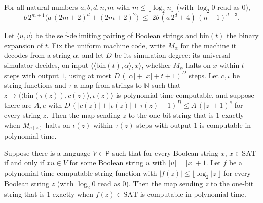 \begin{theorem}
\label{Complexity.ladner_short_SAT_envelope}
\leanok
{}
For all natural numbers $a,b,d,n,m$ with $m\le\lfloor\log_2 n\rfloor$ (with $\log_2 0$ read as $0$),
\[
  b\,2^{m+1}\bigl(a\,(2m+2)^d+(2m+2)^2\bigr)\;\le\;2b\,(a\,2^d+4)\,(n+1)^{d+3}.
\]
\end{theorem}

\begin{theorem}
\label{Complexity.ladner_simulation_on_image}
\leanok
{}
Let $\langle u,v\rangle$ be the self-delimiting pairing of Boolean strings and $\mathrm{bin}(t)$
the binary expansion of $t$. Fix the uniform machine code, write $M_\alpha$ for the machine it
decodes from a string $\alpha$, and let $D$ be its simulation degree: its universal simulator
decides, on input $\langle\langle\mathrm{bin}(t),\alpha\rangle,x\rangle$, whether $M_\alpha$ halts
on $x$ within $t$ steps with output $1$, using at most $D\,(|\alpha|+|x|+t+1)^D$ steps. Let
$c,\iota$ be string functions and $\tau$ a map from strings to $\mathbb N$ such that
$z\mapsto\langle\langle\mathrm{bin}(\tau(z)),c(z)\rangle,\iota(z)\rangle$ is polynomial-time
computable, and suppose there are $A,e$ with
$D\,(|c(z)|+|\iota(z)|+\tau(z)+1)^D\le A\,(|z|+1)^e$ for every string $z$. Then the map sending
$z$ to the one-bit string that is $1$ exactly when $M_{c(z)}$ halts on $\iota(z)$ within
$\tau(z)$ steps with output $1$ is computable in polynomial time.
\end{theorem}

\begin{theorem}
\label{Complexity.ladner_short_SAT_on_image}
\leanok
{}
Suppose there is a language $V\in\mathsf P$ such that for every Boolean string $x$, $x\in\mathrm{SAT}$ if and only if $xu\in V$ for some Boolean string $u$ with $|u|=|x|+1$. Let $f$ be a polynomial-time computable string function with
$|f(z)|\le\lfloor\log_2|z|\rfloor$ for every Boolean string $z$ (with $\log_2 0$ read as $0$).
Then the map sending $z$ to the one-bit string that is $1$ exactly when $f(z)\in\mathrm{SAT}$ is
computable in polynomial time.
\end{theorem}

